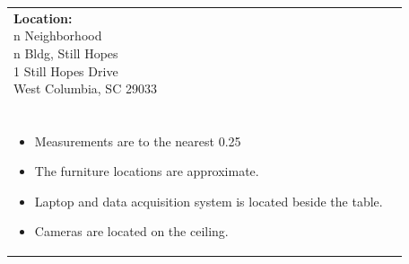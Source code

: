 \documentclass[12pt]{article}
\begin{document}
    \vspace*{\stretch1}  %
    \begin{figure}[H]
        \centering

    \end{figure}
    \vspace*{\stretch1}  %
    
    \vspace*{\fill}  %
    \begin{table}[H]
	\begin{tabular}{l l}
		\makecell[lt]{
			\textbf{Location:}\\
     		n Neighborhood \\
 		    n Bldg, Still Hopes\\
           	1 Still Hopes Drive\\
           	West Columbia, SC 29033\\\\
        }   	
        &	
		\makecell[tp{5in}]{
		\textbf{Notes:}\\
		\vspace{-8mm}  %
		\begin{itemize}
			\setlength\itemsep{-3mm}  %
			\item Measurements are to the nearest \SI{0.25}{\inch}
			\item The furniture locations are approximate.
			\item Laptop and data acquisition system is located beside the table.
			\item Cameras are located on the ceiling.
		\end{itemize}
		}	
			
	\end{tabular}
	\vspace{-8mm} %
\end{table}

    
\end{document}
